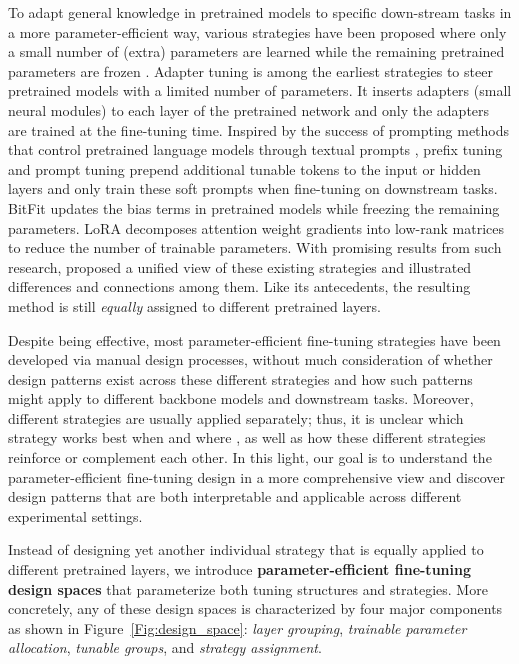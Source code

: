 To adapt general knowledge in pretrained models to specific down-stream tasks in a more parameter-efficient way, various strategies have been proposed where only a small number of (extra) parameters are learned while the remaining pretrained parameters are frozen \citep{pmlr-v97-houlsby19a,pfeiffer-etal-2021-adapterfusion,li2021Prefixtuning,brown2020language,lester2021power,schick-schutze-2021-exploiting,ziems-etal-2022-value}. Adapter tuning \citep{pmlr-v97-houlsby19a} is among the earliest strategies to steer pretrained models with a limited number of parameters. It inserts adapters (small neural modules) to each layer of the pretrained network and only the adapters are trained at the fine-tuning time. Inspired by the success of prompting methods that control pretrained language models through textual prompts \citep{brown2020language}, prefix tuning \citep{li2021Prefixtuning} and prompt tuning \citep{lester-etal-2021-power} prepend additional tunable tokens to the input or hidden layers and only train these soft prompts when fine-tuning on downstream tasks. BitFit \citep{https://doi.org/10.48550/arxiv.2106.10199} updates the bias terms in pretrained models while freezing the remaining parameters. LoRA \citep{https://doi.org/10.48550/arxiv.2106.09685} decomposes attention weight gradients into low-rank matrices to reduce the number of trainable parameters. With promising results from such research,
\citet{https://doi.org/10.48550/arxiv.2110.04366} proposed a unified view of these existing strategies and illustrated differences and connections among them. Like its antecedents, the resulting method is still \emph{equally} assigned to different pretrained layers.

Despite being effective, most parameter-efficient fine-tuning strategies have been developed via manual design processes, without much consideration of whether design patterns exist across these different strategies and how such patterns might apply to different backbone models and downstream tasks. Moreover, different strategies are usually applied separately; thus, it is unclear which strategy works best when and where \citep{mao-etal-2022-unipelt}, as well as how these different strategies reinforce or complement each other. In this light, our goal is to understand the parameter-efficient fine-tuning design in a more comprehensive view and discover design patterns that are both interpretable and applicable across different experimental settings. 

Instead of designing yet another individual strategy that is equally applied to different pretrained layers, we introduce \textbf{parameter-efficient fine-tuning design spaces} that parameterize both tuning structures and strategies. More concretely, any of these design spaces is characterized by four major components as shown in Figure~\ref{Fig:design_space}: \emph{layer grouping}, \emph{trainable parameter allocation}, \emph{tunable groups}, and \emph{strategy assignment}. 

